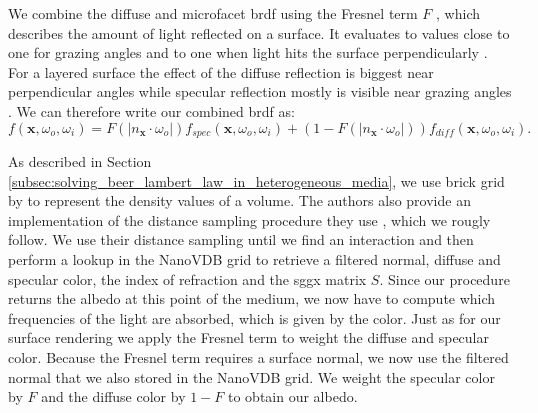 We combine the diffuse and microfacet \ac{brdf} using the Fresnel term $F$ \cite{fresnel}, which describes the amount of light reflected on a surface.
It evaluates to values close to one for grazing angles and to one when light hits the surface perpendicularly \cite{pbr}.
For a layered surface the effect of the diffuse reflection is biggest near perpendicular angles while specular reflection mostly is visible near grazing angles \cite{pbr}.
We can therefore write our combined \ac{brdf} as:
\begin{equation*}
    f(\boldsymbol{x}, \omega_o, \omega_i) = F(|n_{\boldsymbol{x}} \cdot \omega_o|)f_{spec}(\boldsymbol{x}, \omega_o, \omega_i) + (1 - F(|n_{\boldsymbol{x}} \cdot \omega_o|))f_{diff}(\boldsymbol{x}, \omega_o, \omega_i).
\end{equation*}

As described in Section \ref{subsec:solving_beer_lambert_law_in_heterogeneous_media}, we use brick grid by \citeauthor{brick_grid} \cite{brick_grid} to represent the density values of a volume.
The authors also provide an implementation of the distance sampling procedure they use \cite{brick_grid}, which we rougly follow.
We use their distance sampling until we find an interaction and then perform a lookup in the NanoVDB grid to retrieve a filtered normal, diffuse and specular color, the index of refraction and the \ac{sggx} matrix $S$.
Since our procedure returns the albedo at this point of the medium, we now have to compute which frequencies of the light are absorbed, which is given by the color.
Just as for our surface rendering we apply the Fresnel term to weight the diffuse and specular color.
Because the Fresnel term requires a surface normal, we now use the filtered normal that we also stored in the NanoVDB grid.
We weight the specular color by $F$ and the diffuse color by $1-F$ to obtain our albedo.

